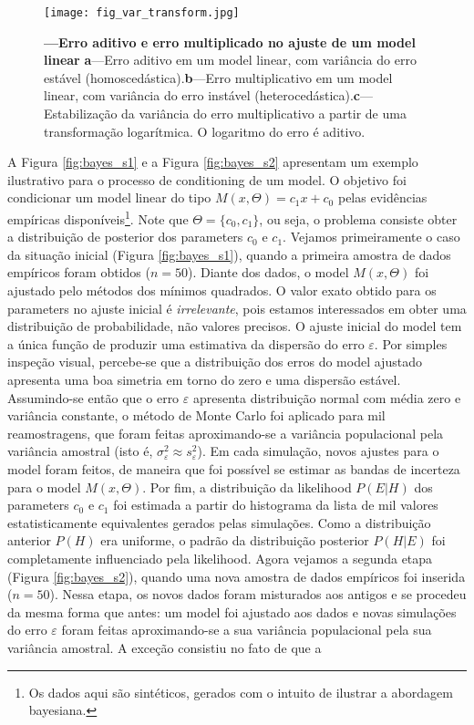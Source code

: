 \documentclass[./main.tex]{subfiles}
\begin{document}
\begin{figure}[t!] %
	\centering				
	\texttt{[image: fig\_var\_transform.jpg]}		
	\caption[Erro aditivo e erro multiplicativo]
	{\textbf{---\;Erro aditivo e erro multiplicado no ajuste de um \gls{model} linear}
        \;\textbf{a}\;---\;Erro aditivo em um \gls{model} linear, com variância do erro estável (homoscedástica).\;\textbf{b}\;---\;Erro multiplicativo em um \gls{model} linear, com variância do erro instável (heterocedástica).\;\textbf{c}\;---\;Estabilização da variância do erro multiplicativo a partir de uma transformação logarítmica. O logaritmo do erro é aditivo.
	}
\label{fig:var_transform}  %
\end{figure}
\par A Figura \ref{fig:bayes_s1} e a Figura \ref{fig:bayes_s2} apresentam um exemplo ilustrativo para o processo de \gls{conditioning} de um \gls{model}. O objetivo foi condicionar um \gls{model} linear do tipo $M(x, \Theta) = c_{1}x + c_{0}$ pelas evidências empíricas disponíveis\footnote{Os dados aqui são sintéticos, gerados com o intuito de ilustrar a abordagem bayesiana.}. Note que $\Theta=\{c_{0}, c_{1}\}$, ou seja, o problema consiste obter a distribuição de \gls{posterior} dos \gls{parameters} $c_0$ e $c_1$. Vejamos primeiramente o caso da situação inicial (Figura \ref{fig:bayes_s1}), quando a primeira amostra de dados empíricos foram obtidos ($n=50$). Diante dos dados, o \gls{model} $M(x, \Theta)$ foi ajustado pelo métodos dos mínimos quadrados. O valor exato obtido para os \gls{parameters} no ajuste inicial é \textit{irrelevante}, pois estamos interessados em obter uma distribuição de probabilidade, não valores precisos. O ajuste inicial do \gls{model} tem a única função de produzir uma estimativa da dispersão do erro $\varepsilon$. Por simples inspeção visual, percebe-se que a distribuição dos erros do \gls{model} ajustado apresenta uma boa simetria em torno do zero e uma dispersão estável. Assumindo-se então que o erro $\varepsilon$ apresenta distribuição normal com média zero e variância constante, o método de Monte Carlo foi aplicado para mil reamostragens, que foram feitas aproximando-se a variância populacional pela variância amostral (isto é, $\sigma^2_\varepsilon \approx s^2_\varepsilon$). Em cada simulação, novos ajustes para o \gls{model} foram feitos, de maneira que foi possível se estimar as bandas de incerteza para o \gls{model} $M(x, \Theta)$.  Por fim, a distribuição da \gls{likelihood} $P(E | H)$ dos \gls{parameters} $c_0$ e $c_1$ foi estimada a partir do histograma da lista de mil valores estatisticamente equivalentes gerados pelas simulações. Como a distribuição anterior $P(H)$ era uniforme, o padrão da distribuição posterior $P(H | E)$ foi completamente influenciado pela \gls{likelihood}. Agora vejamos a segunda etapa (Figura \ref{fig:bayes_s2}), quando uma nova amostra de dados empíricos foi inserida ($n=50$). Nessa etapa, os novos dados foram misturados aos antigos e se procedeu da mesma forma que antes: um \gls{model} foi ajustado aos dados e novas simulações do erro $\varepsilon$ foram feitas aproximando-se a sua variância populacional pela sua variância amostral. A exceção consistiu no fato de que a 
\end{document}
